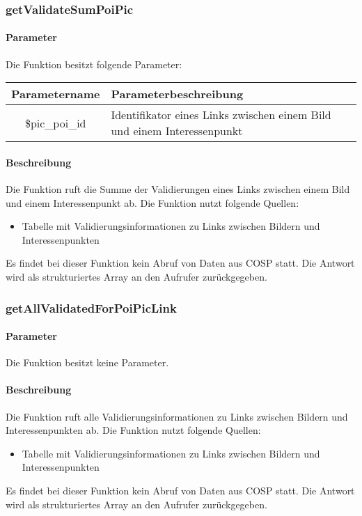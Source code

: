 \subsubsection{getValidateSumPoiPic}
\paragraph{Parameter} Die Funktion besitzt folgende Parameter:
\begin{table}[H]
	\begin{tabular}{|c|p{11cm}|}
		\hline
		\textbf{Parametername} & \textbf{Parameterbeschreibung} \\ \hline
		\$pic\_poi\_id & Identifikator eines Links zwischen einem Bild und einem Interessenpunkt \\ \hline
	\end{tabular}
\end{table}
\paragraph{Beschreibung} Die Funktion ruft die Summe der Validierungen eines Links zwischen einem Bild und einem Interessenpunkt ab. Die Funktion nutzt folgende Quellen:
\begin{itemize}
	\item Tabelle mit Validierungsinformationen zu Links zwischen Bildern und Interessenpunkten
\end{itemize}
Es findet bei dieser Funktion kein Abruf von Daten aus {\glqq COSP\grqq} statt. Die Antwort wird als strukturiertes Array an den Aufrufer zurückgegeben.
\subsubsection{getAllValidatedForPoiPicLink}
\paragraph{Parameter} Die Funktion besitzt keine Parameter.
\paragraph{Beschreibung} Die Funktion ruft alle Validierungsinformationen zu Links zwischen Bildern und Interessenpunkten ab. Die Funktion nutzt folgende Quellen:
\begin{itemize}
	\item Tabelle mit Validierungsinformationen zu Links zwischen Bildern und Interessenpunkten
\end{itemize}
Es findet bei dieser Funktion kein Abruf von Daten aus {\glqq COSP\grqq} statt. Die Antwort wird als strukturiertes Array an den Aufrufer zurückgegeben.
